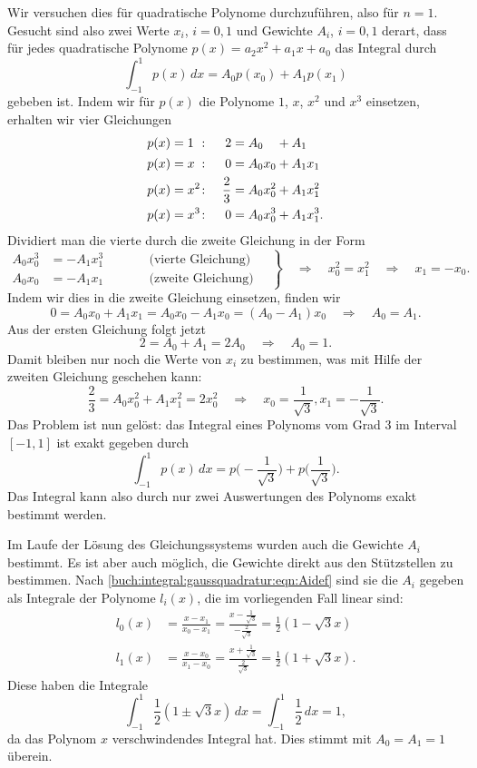 \begin{beispiel}
Wir versuchen dies für quadratische Polynome durchzuführen, also 
für $n=1$.
Gesucht sind also zwei Werte $x_i$, $i=0,1$ und Gewichte $A_i$, $i=0,1$
derart, dass für jedes quadratische Polynome $p(x)=a_2x^2+a_1x+a_0$ 
das Integral durch
\[
\int_{-1}^1 p(x)\,dx
=
A_0 p(x_0) + A_1 p(x_1)
\]
gebeben ist.
Indem wir für $p(x)$ die Polynome $1$, $x$, $x^2$ und $x^3$ einsetzen,
erhalten wir vier Gleichungen
\[
\begin{aligned}
p(x)&=\rlap{$1$}\phantom{x^2}\colon& 2       &= A_0\phantom{x_0}+ A_1     \\
p(x)&=x^{\phantom{2}}\colon& 0       &= A_0x_0   + A_1x_1  \\
p(x)&=x^2\colon& \frac23 &= A_0x_0^2 + A_1x_1^2\\
p(x)&=x^3\colon& 0       &= A_0x_0^3 + A_1x_1^3.
\end{aligned}
\]
Dividiert man die vierte durch die zweite Gleichung in der Form
\[
\left.
\begin{aligned}
A_0x_0^3 &= -A_1x_1^3 &\qquad&\text{(vierte Gleichung)}\\
A_0x_0   &= -A_1x_1   &\qquad&\text{(zweite Gleichung)}
\end{aligned}
\quad
\right\}
\quad
\Rightarrow
\quad
x_0^2=x_1^2
\quad
\Rightarrow
\quad
x_1=-x_0.
\]
Indem wir dies in die zweite Gleichung einsetzen, finden wir 
\[
0 = A_0x_0 + A_1x_1 = A_0x_0 -A_1x_0 = (A_0-A_1)x_0
\quad\Rightarrow\quad
A_0=A_1.
\]
Aus der ersten Gleichung folgt jetzt
\[
2= A_0+A_1 = 2A_0 \quad\Rightarrow\quad A_0 = 1.
\]
Damit bleiben nur noch die Werte von $x_i$ zu bestimmen, was 
mit Hilfe der zweiten Gleichung geschehen kann:
\[
\frac23 = A_0x_0^2 + A_1x_1^2 = 2x_0^2
\quad\Rightarrow\quad
x_0 = \frac{1}{\sqrt{3}}, x_1 = -\frac{1}{\sqrt{3}}.
\]
Das Problem ist nun gelöst: das Integral eines Polynoms vom Grad 3
im Interval $[-1,1]$ ist exakt gegeben durch
\[
\int_{-1}^1 p(x)\,dx
=
p\biggl(-\frac{1}{\sqrt{3}}\biggr)
+
p\biggl(\frac{1}{\sqrt{3}}\biggr).
\]
Das Integral kann also durch nur zwei Auswertungen des Polynoms
exakt bestimmt werden.

Im Laufe der Lösung des Gleichungssystems wurden auch die Gewichte $A_i$
bestimmt.
Es ist aber auch möglich, die Gewichte direkt aus den Stützstellen
zu bestimmen.
Nach \eqref{buch:integral:gaussquadratur:eqn:Aidef}
sind sie die $A_i$ gegeben als Integrale der Polynome
$l_i(x)$, die im vorliegenden Fall linear sind:
\begin{align*}
l_0(x)
&=
\frac{x-x_1}{x_0-x_1}
=
\frac{x-\frac1{\sqrt{3}}}{-\frac{2}{\sqrt{3}}}
=
\frac12(1-\sqrt{3}x)
\\
l_1(x)
&=
\frac{x-x_0}{x_1-x_0}
=
\frac{x+\frac1{\sqrt{3}}}{\frac{2}{\sqrt{3}}}
=
\frac12(1+\sqrt{3}x).
\end{align*}
Diese haben die Integrale
\[
\int_{-1}^1\frac12(1\pm\sqrt{3}x)\,dx
=
\int_{-1}^1 \frac12\,dx
=
1,
\]
da das Polynom $x$ verschwindendes Integral hat.
Dies stimmt mit $A_0=A_1=1$ überein.
\label{buch:integral:beispiel:gaussquadraturn1}
\end{beispiel}

